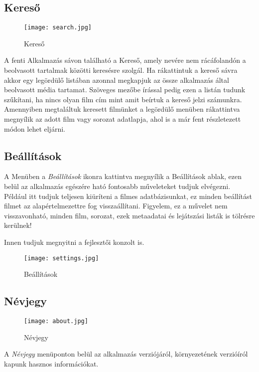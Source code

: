 \subsection{Kereső}
\begin{figure}[H]
	\centering
	\texttt{[image: search.jpg]}
	\caption{Kereső}
	\label{fig:search}
\end{figure}
A fenti Alkalmazás sávon található a Kereső, amely nevére nem rácáfolandón a beolvasott tartalmak közötti keresésre szolgál. Ha rákattintuk a kereső sávra akkor egy legördülő listában azonnal megkapjuk az össze alkalmazás által beolvasott média tartamat. Szöveges mezőbe írással pedig ezen a listán tudunk szűkítani, ha nincs olyan film cím mint amit beírtuk a kereső jelzi számunkra. Amennyiben megtaláltuk keresett filmünket a legördülő menüben rákattintva megnyílik az adott film vagy sorozat adatlapja, ahol is a már fent részletezett módon lehet eljárni.

\subsection{Beállítások}
A Menüben a {\it Beállítások} ikonra kattintva megnyílik a Beállítások ablak, ezen belül az alkalmazás egészére ható fontosabb műveleteket tudjuk elvégezni. Például itt tudjuk teljesen kiüríteni a filmes adatbázisunkat, ez minden beállítást filmet az alapértelmezettre fog visszaállítani. Figyelem, ez a művelet nem visszavonható, minden film, sorozat, ezek metaadatai és lejátszási listák is tölrésre kerülnek!

Innen tudjuk megnyitni a fejlesztői konzolt is.
\begin{figure}[H]
	\centering
	\texttt{[image: settings.jpg]}
	\caption{Beállítások}
	\label{fig:settings}
\end{figure}

\subsection{Névjegy}
\begin{figure}[H]
	\centering
	\texttt{[image: about.jpg]}
	\caption{Névjegy}
	\label{fig:about}
\end{figure}
A {\it Névjegy} menüponton belül az alkalmazás verziójáról, környezetének verzióíról kapunk hasznos információkat.

